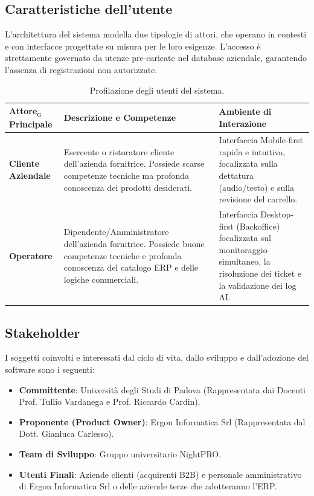 \documentclass[a4paper, 11pt, oneside]{scrartcl} %
\begin{document}
\subsection{Caratteristiche dell'utente}
L'architettura del sistema modella due tipologie di attori, che operano in contesti e con interfacce progettate su misura per le loro esigenze. L'accesso è strettamente governato da utenze pre-caricate nel database aziendale, garantendo l'assenza di registrazioni non autorizzate.

\begin{table}[H]
    \centering
    \renewcommand{\arraystretch}{1.3}
    \begin{tabular}{@{}p{3.5cm}p{6cm}p{5.5cm}@{}}
        \toprule
        \textbf{Attore\textsubscript{\textsc{g}} Principale} & \textbf{Descrizione e Competenze}                                                                                                                         & \textbf{Ambiente di Interazione}                                                                                                       \\
        \midrule
        \textbf{Cliente Aziendale}                           & Esercente o ristoratore cliente dell'azienda fornitrice. Possiede scarse competenze tecniche ma profonda conoscenza dei prodotti desiderati.              & Interfaccia Mobile-first rapida e intuitiva, focalizzata sulla dettatura (audio/testo) e sulla revisione del carrello.                 \\
        \midrule
        \textbf{Operatore}                                   & Dipendente/Amministratore dell'azienda fornitrice. Possiede buone competenze tecniche e profonda conoscenza del catalogo ERP e delle logiche commerciali. & Interfaccia Desktop-first (Backoffice) focalizzata sul monitoraggio simultaneo, la risoluzione dei ticket e la validazione dei log AI. \\
        \bottomrule
    \end{tabular}
    \caption{Profilazione degli utenti del sistema.}
\end{table}

\subsection{Stakeholder}
I soggetti coinvolti e interessati dal ciclo di vita, dallo sviluppo e dall'adozione del software sono i seguenti:
\begin{itemize}
    \item \textbf{Committente}: Università degli Studi di Padova (Rappresentata dai Docenti Prof. Tullio Vardanega e Prof. Riccardo Cardin).
    \item \textbf{Proponente (Product Owner)}: Ergon Informatica Srl (Rappresentata dal Dott. Gianluca Carlesso).
    \item \textbf{Team di Sviluppo}: Gruppo universitario NightPRO.
    \item \textbf{Utenti Finali}: Aziende clienti (acquirenti B2B) e personale amministrativo di Ergon Informatica Srl o delle aziende terze che adotteranno l'ERP.
\end{itemize}
\end{document}
